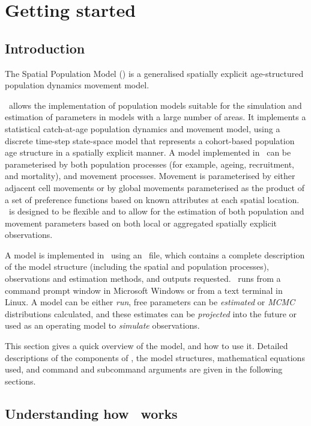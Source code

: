 \section{Getting started\label{sec:Getting-started}}

\subsection{Introduction}

The Spatial Population Model (\SPM) is a generalised spatially explicit age-structured population dynamics movement model. 

\SPM\ allows the implementation of population models suitable for the simulation and estimation of  parameters in models with a large number of areas. It implements a statistical catch-at-age population dynamics and movement model, using a discrete time-step state-space model that represents a cohort-based population age structure in a spatially explicit manner. A model implemented in \SPM\ can be parameterised by both population processes (for example, ageing, recruitment, and mortality), and movement processes. Movement is parameterised by either adjacent cell movements or by global movements parameterised as the product of a set of preference functions based on known attributes at each spatial location. \SPM\ is designed to be flexible and to allow for the estimation of both population and movement parameters based on both local or aggregated spatially explicit observations. 

A model is implemented in \SPM\ using an \config\ file, which contains a complete description of the model structure (including the spatial and population processes), observations and estimation methods, and outputs requested. \SPM\ runs from a command prompt window in Microsoft Windows or from a text terminal in Linux. A model can be either \emph{run}, free parameters can be \emph{estimated} or \emph{MCMC} distributions calculated, and these estimates can be \emph{projected} into the future or used as an operating model to \emph{simulate} observations.

This section gives a quick overview of the model, and how to use it. Detailed descriptions of the components of \SPM, the model structures, mathematical equations used, and command and subcommand arguments are given in the following sections.

\subsection{Understanding how \SPM\ works}

